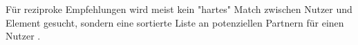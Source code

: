 Für reziproke Empfehlungen wird meist kein "hartes" Match zwischen Nutzer und Element gesucht, sondern eine sortierte Liste an potenziellen Partnern für einen Nutzer \cite[S. 67]{diaz:inproceedings}.

